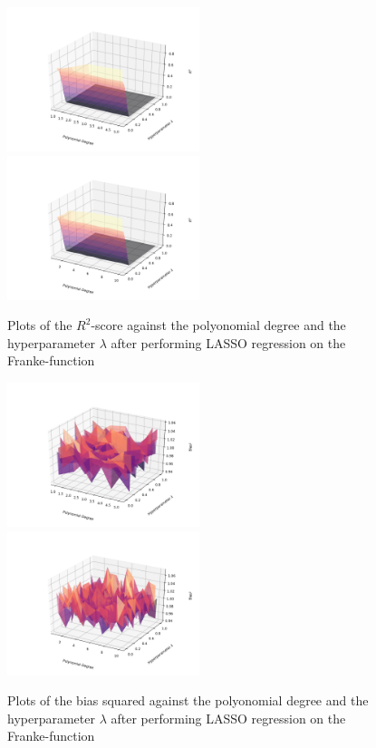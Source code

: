 \documentclass[a4paper,10pt,english]{article}
\begin{document}
\begin{figure}[H]
	\centering 
	\includegraphics[width = 0.5\textwidth, center]{../franke_output/part_E_3.png}
	\includegraphics[width = 0.5\textwidth, center]{../franke_output/part_E_3_highdeg.png}
	\caption{
		Plots of the $R^2$-score against the polyonomial degree and the hyperparameter $\lambda$ after performing LASSO regression on the Franke-function
	}
	\label{part_e3}
\end{figure}

\begin{figure}[H]
	\centering 
	\includegraphics[width = 0.5\textwidth, center]{../franke_output/part_E_4.png}
	\includegraphics[width = 0.5\textwidth, center]{../franke_output/part_E_4_highdeg.png}
	\caption{
		Plots of the bias squared against the polyonomial degree and the hyperparameter $\lambda$ after performing LASSO regression on the Franke-function 
	}
	\label{part_e4}
\end{figure}
\end{document}

